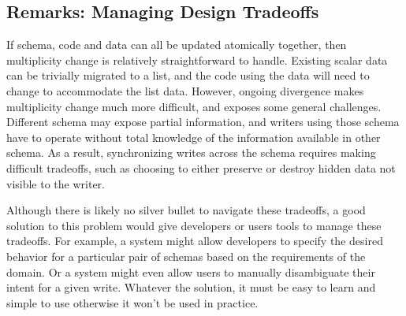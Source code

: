\documentclass[english,submission]{programming}
\begin{document}
\subsection*{Remarks: Managing Design Tradeoffs}

If schema, code and data can all be updated atomically together, then multiplicity change is
relatively straightforward to handle. Existing scalar data can be trivially migrated to a
list, and the code using the data will need to change to accommodate the list data.
%
However, ongoing divergence makes multiplicity change much more difficult, and exposes
some general challenges. Different schema may expose partial information, and writers using
those schema have to operate without total knowledge of the information available in other schema.
As a result, synchronizing writes across the schema requires making difficult tradeoffs, such as
choosing to either preserve or destroy hidden data not visible to the writer.

Although there is likely no silver bullet to navigate these tradeoffs, a good solution to this
problem would give developers or users tools to manage these tradeoffs. For example, a system
might allow developers to specify the desired behavior for a particular pair of schemas based
on the requirements of the domain. Or a system might even allow users to manually
disambiguate their intent for a given write.
Whatever the solution, it must be easy to learn and simple to use otherwise it won't be used in practice.

\end{document}

